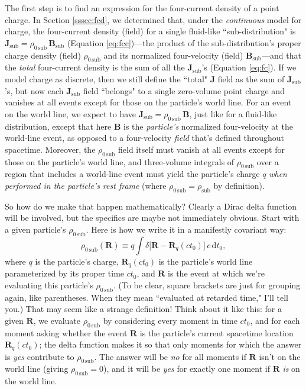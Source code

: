 \documentclass[12pt]{article}
\renewcommand{\vv}[1]{\mathbf{#1}}
\newcommand{\dd}[1]{\mathrm{d}#1}
\begin{document}
The first step is to find an expression for the four-current density of a point charge. In Section \ref{sssec:fcd}, we determined that, under the \emph{continuous} model for charge, the four-current density (field) for a single fluid-like ``sub-distribution" is ${\vv J_{\mathrm{sub}} = \rho_{0 \, \mathrm{sub}} \, \vv B_{\mathrm{sub}}}$ (Equation \ref{eq:fcc})---the product of the sub-distribution's proper charge density (field) $\rho_{0 \, \mathrm{sub}}$ and its normalized four-velocity (field) $\vv B_{\mathrm{sub}}$---and that the \emph{total} four-current density is the sum of all the $\vv J_{\mathrm{sub}}$'s (Equation \ref{eq:fc}). If we model charge as discrete, then we still define the ``total" $\vv J$ field as the sum of $\vv J_{\mathrm{sub}}$'s, but now each $\vv J_{\mathrm{sub}}$ field ``belongs" to a single zero-volume point charge and vanishes at all events except for those on the particle's world line. For an event on the world line, we expect to have $\vv J_{\mathrm{sub}} = \rho_{0 \, \mathrm{sub}} \, \vv B$, just like for a fluid-like distribution, except that here $\vv B$ is the \emph{particle's} normalized four-velocity at the world-line event, as opposed to a four-velocity \emph{field} that's defined throughout spacetime. Moreover, the $\rho_{0 \, \mathrm{sub}}$ field itself must vanish at all events except for those on the particle's world line, and three-volume integrals of $\rho_{0 \, \mathrm{sub}}$ over a region that includes a world-line event must yield the particle's charge $q$ \emph{when performed in the particle's rest frame} (where $\rho_{0 \, \mathrm{sub}} = \rho_{\mathrm{sub}}$ by definition).

So how do we make that happen mathematically? Clearly a Dirac delta function will be involved, but the specifics are maybe not immediately obvious. Start with a given particle's $\rho_{0 \, \mathrm{sub}}$. Here is how we write it in a manifestly covariant way:
\begin{equation}\label{eq:rho0part}
\rho_{0 \, \mathrm{sub}} (\vv R) \equiv q \int \delta \big[ \vv R - \vv R_q (ct_0) \big] \, c \, \dd t_0 ,
\end{equation}
where $q$ is the particle's charge, $\vv R_q (ct_0)$ is the particle's world line parameterized by its proper time $ct_0$, and $\vv R$ is the event at which we're evaluating this particle's $\rho_{0 \, \mathrm{sub}}$. (To be clear, square brackets are just for grouping again, like parentheses. When they mean ``evaluated at retarded time," I'll tell you.) That may seem like a strange definition! Think about it like this: for a given $\vv R$, we evaluate $\rho_{0 \, \mathrm{sub}}$ by considering every moment in time $ct_0$, and for each moment asking whether the event $\vv R$ is the particle's current spacetime location $\vv R_q (ct_0)$; the delta function makes it so that only moments for which the answer is \emph{yes} contribute to $\rho_{0 \, \mathrm{sub}}$. The answer will be \emph{no} for all moments if $\vv R$ isn't on the world line (giving $\rho_{0 \, \mathrm{sub}} = 0$), and it will be \emph{yes}  for exactly one moment if $\vv R$ \emph{is} on the world line.
\end{document}
